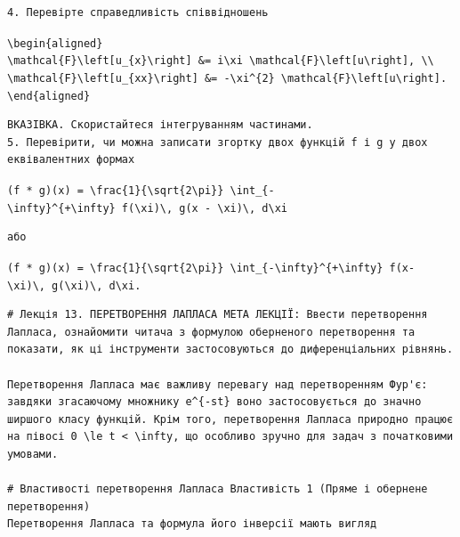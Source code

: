 \documentclass[
  ukrainian,
]{article}
\begin{document}
\begin{verbatim}
4. Перевірте справедливість співвідношень
\end{verbatim}

\texttt{\textbackslash{}begin\{aligned\}}
\texttt{\textbackslash{}mathcal\{F\}\textbackslash{}left{[}u\_\{x\}\textbackslash{}right{]}\ \&=\ i\textbackslash{}xi\ \textbackslash{}mathcal\{F\}\textbackslash{}left{[}u\textbackslash{}right{]},\ \textbackslash{}\textbackslash{}}
\texttt{\textbackslash{}mathcal\{F\}\textbackslash{}left{[}u\_\{xx\}\textbackslash{}right{]}\ \&=\ -\textbackslash{}xi\^{}\{2\}\ \textbackslash{}mathcal\{F\}\textbackslash{}left{[}u\textbackslash{}right{]}.}
\texttt{\textbackslash{}end\{aligned\}}

\begin{verbatim}
ВКАЗІВКА. Скористайтеся інтегруванням частинами.
5. Перевірити, чи можна записати згортку двох функцій f і g у двох еквівалентних формах
\end{verbatim}

\texttt{(f\ *\ g)(x)\ =\ \textbackslash{}frac\{1\}\{\textbackslash{}sqrt\{2\textbackslash{}pi\}\}\ \textbackslash{}int\_\{-\textbackslash{}infty\}\^{}\{+\textbackslash{}infty\}\ f(\textbackslash{}xi)\textbackslash{},\ g(x\ -\ \textbackslash{}xi)\textbackslash{},\ d\textbackslash{}xi}

\begin{verbatim}
або
\end{verbatim}

\texttt{(f\ *\ g)(x)\ =\ \textbackslash{}frac\{1\}\{\textbackslash{}sqrt\{2\textbackslash{}pi\}\}\ \textbackslash{}int\_\{-\textbackslash{}infty\}\^{}\{+\textbackslash{}infty\}\ f(x-\textbackslash{}xi)\textbackslash{},\ g(\textbackslash{}xi)\textbackslash{},\ d\textbackslash{}xi.}

\begin{verbatim}
# Лекція 13. ПЕРЕТВОРЕННЯ ЛАПЛАСА МЕТА ЛЕКЦІЇ: Ввести перетворення Лапласа, ознайомити читача з формулою оберненого перетворення та показати, як ці інструменти застосовуються до диференціальних рівнянь.

Перетворення Лапласа має важливу перевагу над перетворенням Фур'є: завдяки згасаючому множнику e^{-st} воно застосовується до значно ширшого класу функцій. Крім того, перетворення Лапласа природно працює на півосі 0 \le t < \infty, що особливо зручно для задач з початковими умовами.

# Властивості перетворення Лапласа Властивість 1 (Пряме і обернене перетворення)
Перетворення Лапласа та формула його інверсії мають вигляд
\end{verbatim}
\end{document}

